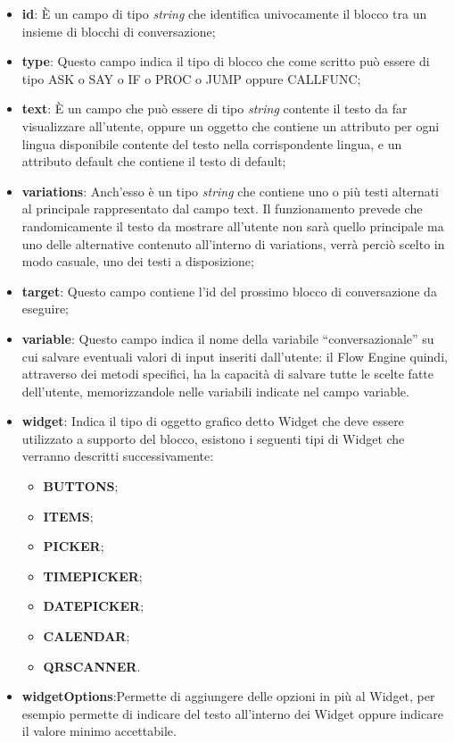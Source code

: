 \begin{itemize}
	\item \textbf{id}: È un campo di tipo \emph{string} che identifica univocamente il blocco tra un insieme di blocchi di conversazione;
	\item \textbf{type}: Questo campo indica il tipo di blocco che come scritto può essere di tipo ASK o SAY o IF o PROC o JUMP oppure CALLFUNC;        
	\item \textbf{text}: È un campo che può essere di tipo \emph{string} contente il testo da far visualizzare all'utente, oppure un oggetto che contiene un attributo per ogni lingua disponibile contente del testo nella corrispondente lingua, e un attributo default che contiene il testo di default;
	\item \textbf{variations}: Anch'esso è un tipo \emph{string} che contiene uno o più testi alternati al principale rappresentato dal campo text. Il funzionamento prevede che randomicamente il testo da mostrare all'utente non sarà quello principale ma uno delle alternative contenuto all'interno di variations, verrà perciò scelto in modo casuale, uno dei testi a disposizione; 
	\item \textbf{target}: Questo campo contiene l'id del prossimo blocco di conversazione da eseguire;
	\item \textbf{variable}: Questo campo indica il nome della variabile “conversazionale” su cui salvare eventuali valori di input inseriti dall’utente: il Flow Engine quindi, attraverso dei metodi specifici, ha la capacità di salvare tutte le scelte fatte dell’utente, memorizzandole nelle variabili indicate nel campo variable.
	\item \textbf{widget}: Indica il tipo di oggetto grafico detto Widget che deve essere utilizzato a supporto del blocco, esistono i seguenti tipi di Widget che verranno descritti successivamente:
	\begin{itemize}
		\item \textbf{BUTTONS};
		\item \textbf{ITEMS};
		\item \textbf{PICKER};
		\item \textbf{TIMEPICKER};
		\item \textbf{DATEPICKER};
		\item \textbf{CALENDAR};
		\item \textbf{QRSCANNER}.
	\end{itemize}
	\item \textbf{widgetOptions}:Permette di aggiungere delle opzioni in più al Widget, per esempio permette di indicare del testo all'interno dei Widget oppure indicare il valore minimo accettabile.
\end{itemize} 

